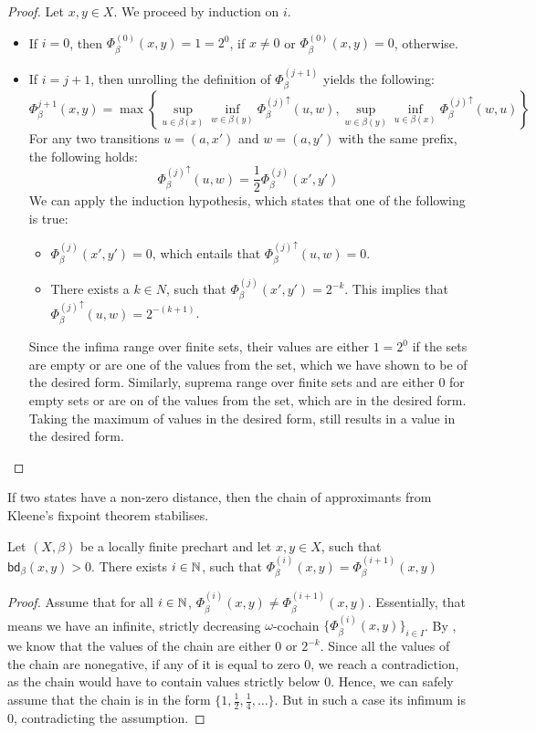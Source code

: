 \begin{proof}
	Let $x,y \in X$. We proceed by induction on $i$. 
	
	\begin{itemize}
		\item If $i = 0$, then $\Phi^{(0)}_\beta(x,y)=1=2^{0}$, if $x\not=0$ or $\Phi^{(0)}_\beta(x,y)=0$, otherwise. 
		\item If $i = j + 1$, then unrolling the definition of $\Phi_\beta^{(j+1)}$ yields the following:
			$$\Phi^{j + 1}_\beta(x,y) = \max \left\{\sup_{u \in \beta(x)} \inf_{w \in \beta(y)} {\Phi^{(j)}_\beta}^\uparrow(u,w), \sup_{w \in \beta(y)} \inf_{u \in \beta(x)}{\Phi^{(j)}_\beta}^\uparrow(w,u)\right\}$$
			For any two transitions $u = (a,x')$ and $w=(a,y')$ with the same prefix, the following holds:
			$${\Phi^{(j)}_\beta}^\uparrow(u,w)=\frac{1}{2} {\Phi^{(j)}_\beta}(x',y')$$
			We can apply the induction hypothesis, which states that one of the following is true:
			\begin{itemize}
				\item${\Phi^{(j)}_\beta}(x',y')=0$, which entails that ${\Phi^{(j)}_\beta}^\uparrow(u,w)=0$.
				\item There exists a $k \in N$, such that ${\Phi^{(j)}_\beta}(x',y')=2^{-k}$. This implies that ${\Phi^{(j)}_\beta}^\uparrow(u,w)=2^{-(k+1)}$.
			\end{itemize}
			Since the infima range over finite sets, their values are either $1=2^0$ if the sets are empty or are one of the values from the set, which we have shown to be of the desired form. Similarly, suprema range over finite sets and are either $0$ for empty sets or are on of the values from the set, which are in the desired form. Taking the maximum of values in the desired form, still results in a value in the desired form.\qedhere
	\end{itemize}
\end{proof}
If two states have a non-zero distance, then the chain of approximants from Kleene's fixpoint theorem stabilises.
\begin{lemma}\label{lem:chain_stabilises}
	Let $(X, \beta)$ be a locally finite prechart and let $x,y \in X$, such that $\mathsf{bd}_\beta(x,y)>0$. There exists $i \in \mathbb{N}$, such that $\Phi_\beta^{(i)}(x,y)=\Phi^{(i+1)}_\beta(x,y)$
\end{lemma}
\begin{proof}
	Assume that for all $i \in \mathbb{N}$, $\Phi_\beta^{(i)}(x,y)\neq\Phi^{(i+1)}_\beta(x,y)$. Essentially, that means we have an infinite, strictly decreasing $\omega$-cochain $\{\Phi^{(i)}_\beta(x,y)\}_{i \in I}$. By , we know that the values of the chain are either $0$ or $2^{-k}$. Since all the values of the chain are nonegative, if any of it is equal to zero $0$, we reach a contradiction, as the chain would have to contain values strictly below $0$. Hence, we can safely assume that the chain is in the form $\{1,\frac{1}{2}, \frac{1}{4}, \dots\}$. But in such a case its infimum is $0$, contradicting the assumption.
\end{proof}
